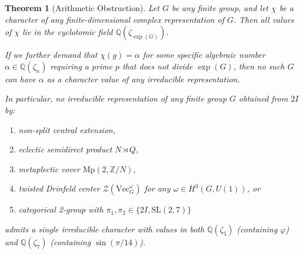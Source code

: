 \documentclass[11pt,a4paper]{amsart}
\newtheorem{maintheorem}{Theorem}
\theoremstyle{definition}
\theoremstyle{remark}
\newcommand{\SL}{\mathrm{SL}}
\newcommand{\Mp}{\mathrm{Mp}}
\newcommand{\VecCat}{\mathrm{Vec}}
\newcommand{\bbZ}{\mathbb{Z}}
\newcommand{\bbQ}{\mathbb{Q}}
\begin{document}
\begin{maintheorem}[Arithmetic Obstruction]\label{thm:arith}
Let $G$ be any finite group, and let $\chi$ be a character of any
finite-dimensional complex representation of $G$. Then all values of $\chi$
lie in the cyclotomic field $\bbQ(\zeta_{\exp(G)})$.

If we further demand that $\chi(g) = \alpha$ for some specific algebraic
number $\alpha \in \bbQ(\zeta_n)$ requiring a prime $p$ that does not divide
$\exp(G)$, then no such $G$ can have $\alpha$ as a character value of any
irreducible representation.

In particular, no irreducible representation of any finite group $G$ obtained
from $2I$ by:
\begin{enumerate}[label=(\alph*)]
  \item non-split central extension,
  \item eclectic semidirect product $N \rtimes Q$,
  \item metaplectic cover $\Mp(2,\bbZ/N)$,
  \item twisted Drinfeld center $\mathcal{Z}(\VecCat_G^\omega)$ for any
        $\omega \in H^3(G, U(1))$, or
  \item categorical 2-group with $\pi_1, \pi_2 \in \{2I, \SL(2,7)\}$
\end{enumerate}
admits a single irreducible character with values in both $\bbQ(\zeta_5)$
(containing $\varphi$) and $\bbQ(\zeta_7)$ (containing $\sin(\pi/14)$).
\end{maintheorem}
\end{document}
